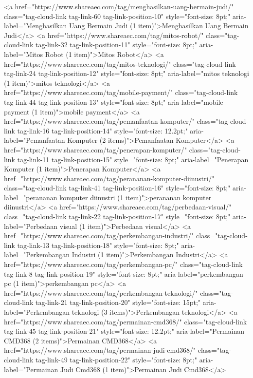 <a href="https://www.shareaec.com/tag/menghasilkan-uang-bermain-judi/" class="tag-cloud-link tag-link-60 tag-link-position-10" style="font-size: 8pt;" aria-label="Menghasilkan Uang Bermain Judi (1 item)">Menghasilkan Uang Bermain Judi</a>
<a href="https://www.shareaec.com/tag/mitos-robot/" class="tag-cloud-link tag-link-32 tag-link-position-11" style="font-size: 8pt;" aria-label="Mitos Robot (1 item)">Mitos Robot</a>
<a href="https://www.shareaec.com/tag/mitos-teknologi/" class="tag-cloud-link tag-link-24 tag-link-position-12" style="font-size: 8pt;" aria-label="mitos teknologi (1 item)">mitos teknologi</a>
<a href="https://www.shareaec.com/tag/mobile-payment/" class="tag-cloud-link tag-link-44 tag-link-position-13" style="font-size: 8pt;" aria-label="mobile payment (1 item)">mobile payment</a>
<a href="https://www.shareaec.com/tag/pemanfaatan-komputer/" class="tag-cloud-link tag-link-16 tag-link-position-14" style="font-size: 12.2pt;" aria-label="Pemanfaatan Komputer (2 items)">Pemanfaatan Komputer</a>
<a href="https://www.shareaec.com/tag/penerapan-komputer/" class="tag-cloud-link tag-link-11 tag-link-position-15" style="font-size: 8pt;" aria-label="Penerapan Komputer (1 item)">Penerapan Komputer</a>
<a href="https://www.shareaec.com/tag/perananan-komputer-diinustri/" class="tag-cloud-link tag-link-41 tag-link-position-16" style="font-size: 8pt;" aria-label="perananan komputer diinustri (1 item)">perananan komputer diinustri</a>
<a href="https://www.shareaec.com/tag/perbedaan-visual/" class="tag-cloud-link tag-link-22 tag-link-position-17" style="font-size: 8pt;" aria-label="Perbedaan visual (1 item)">Perbedaan visual</a>
<a href="https://www.shareaec.com/tag/perkembangan-industri/" class="tag-cloud-link tag-link-13 tag-link-position-18" style="font-size: 8pt;" aria-label="Perkembangan Industri (1 item)">Perkembangan Industri</a>
<a href="https://www.shareaec.com/tag/perkembangan-pc/" class="tag-cloud-link tag-link-8 tag-link-position-19" style="font-size: 8pt;" aria-label="perkembangan pc (1 item)">perkembangan pc</a>
<a href="https://www.shareaec.com/tag/perkembangan-teknologi/" class="tag-cloud-link tag-link-21 tag-link-position-20" style="font-size: 15pt;" aria-label="Perkembangan teknologi (3 items)">Perkembangan teknologi</a>
<a href="https://www.shareaec.com/tag/permainan-cmd368/" class="tag-cloud-link tag-link-45 tag-link-position-21" style="font-size: 12.2pt;" aria-label="Permainan CMD368 (2 items)">Permainan CMD368</a>
<a href="https://www.shareaec.com/tag/permainan-judi-cmd368/" class="tag-cloud-link tag-link-49 tag-link-position-22" style="font-size: 8pt;" aria-label="Permainan Judi Cmd368 (1 item)">Permainan Judi Cmd368</a>
